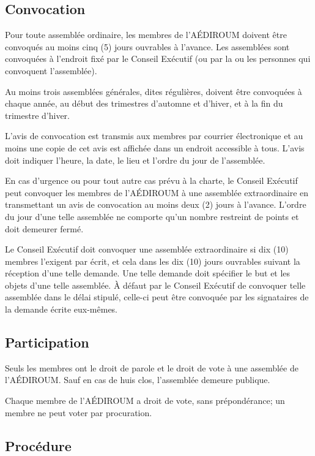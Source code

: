 \documentclass{aediroum}
\begin{document}
\subsection{Convocation}\label{sec:convocation-generale}

Pour toute assemblée ordinaire, les membres de l'AÉDIROUM doivent être convoqués au moins cinq (5) jours ouvrables à l'avance. Les assemblées sont convoquées à l'endroit fixé par le Conseil Exécutif (ou par la ou les personnes qui convoquent l'assemblée).

Au moins trois assemblées générales, dites régulières, doivent être convoquées à chaque année, au début des trimestres d'automne et d'hiver, et à la fin du trimestre d'hiver.

L'avis de convocation est transmis aux membres par courrier électronique et au moins une copie de cet avis est affichée dans un endroit accessible à tous. L'avis doit indiquer l'heure, la date, le lieu et l'ordre du jour de l'assemblée.

En cas d'urgence ou pour tout autre cas prévu à la charte, le Conseil Exécutif peut convoquer les membres de l'AÉDIROUM à une assemblée extraordinaire en transmettant un avis de convocation au moins deux (2) jours à l'avance. L'ordre du jour d'une telle assemblée ne comporte qu'un nombre restreint de points et doit demeurer fermé.

Le Conseil Exécutif doit convoquer une assemblée extraordinaire si dix (10) membres l'exigent par écrit, et cela dans les dix (10) jours ouvrables suivant la réception d'une telle demande. Une telle demande doit spécifier le but et les objets d'une telle assemblée. À défaut par le Conseil Exécutif de convoquer telle assemblée dans le délai stipulé, celle-ci peut être convoquée par les signataires de la demande écrite eux-mêmes.

\subsection{Participation}\label{sec:participation}

Seuls les membres ont le droit de parole et le droit de vote à une assemblée de l'AÉDIROUM. Sauf en cas de huis clos, l'assemblée demeure publique.

Chaque membre de l'AÉDIROUM a droit de vote, sans prépondérance; un membre ne peut voter par procuration.

\subsection{Procédure}\label{sec:procedure-generale}
\end{document}

